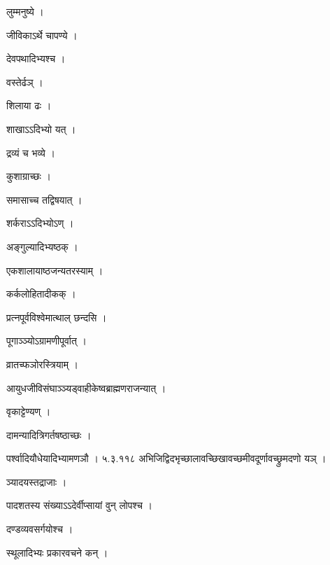 \documentclass[10pt, openany]{book}
\begin{document}
\noindent लुम्मनुष्ये ।

\noindent जीविकाऽर्थे चापण्ये ।

\noindent देवपथादिभ्यश्च ।

\noindent वस्तेर्ढञ् ।

\noindent शिलाया ढः ।

\noindent शाखाऽऽदिभ्यो यत् ।

\noindent द्रव्यं च भव्ये ।

\noindent कुशाग्राच्छः ।

\noindent समासाच्च तद्विषयात् ।

\noindent शर्कराऽऽदिभ्योऽण् ।

\noindent अङ्गुल्यादिभ्यष्ठक् ।

\noindent एकशालायाष्ठजन्यतरस्याम् ।

\noindent कर्कलोहितादीकक् ।

\noindent प्रत्नपूर्वविश्वेमात्थाल् छन्दसि ।

\noindent पूगाञ्ञ्योऽग्रामणीपूर्वात् ।

\noindent व्रातच्फञोरस्त्रियाम् ।

\noindent आयुधजीविसंघाञ्ञ्यड्वाहीकेष्वब्राह्मणराजन्यात् ।

\noindent वृकाट्टेण्यण् ।

\noindent दामन्यादित्रिगर्तषष्ठाच्छः ।

\noindent पर्श्वादियौधेयादिभ्यामणञौ । ५.३.११८ अभिजिद्विदभृच्छालावच्छिखावच्छमीवदूर्णावच्छ्रुमदणो यञ् ।

\noindent ञ्यादयस्तद्राजाः ।

\noindent पादशतस्य संख्याऽऽदेर्वीप्सायां वुन् लोपश्च ।

\noindent दण्डव्यवसर्गयोश्च ।

\noindent स्थूलादिभ्यः प्रकारवचने कन् ।
\end{document}
